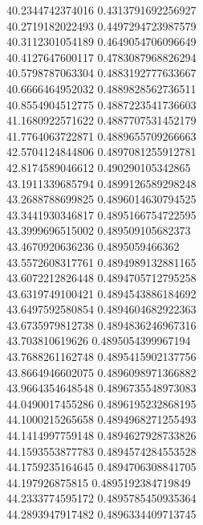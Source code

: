 {40.2344742374016 0.4313791692256927
 \\
40.2719182022493 0.4497294723987579
 \\
40.3112301054189 0.4649054706096649
 \\
40.4127647600117 0.4783087968826294
 \\
40.5798787063304 0.4883192777633667
 \\
40.6666464952032 0.4889828562736511
 \\
40.8554904512775 0.4887223541736603
 \\
41.1680922571622 0.4887707531452179
 \\
41.7764063722871 0.4889655709266663
 \\
42.5704124844806 0.4897081255912781
 \\
42.8174589046612 0.490290105342865
 \\
43.1911339685794 0.4899126589298248
 \\
43.2688788699825 0.4896014630794525
 \\
43.3441930346817 0.4895166754722595
 \\
43.3999696515002 0.489509105682373
 \\
43.4670920636236 0.4895059466362
 \\
43.5572608317761 0.4894989132881165
 \\
43.6072212826448 0.4894705712795258
 \\
43.6319749100421 0.4894543886184692
 \\
43.6497592580854 0.4894604682922363
 \\
43.6735979812738 0.4894836246967316
 \\
43.703810619626 0.4895054399967194
 \\
43.7688261162748 0.4895415902137756
 \\
43.8664946602075 0.4896098971366882
 \\
43.9664354648548 0.4896735548973083
 \\
44.0490017455286 0.4896195232868195
 \\
44.1000215265658 0.4894968271255493
 \\
44.1414997759148 0.4894627928733826
 \\
44.1593553877783 0.4894574284553528
 \\
44.1759235164645 0.4894706308841705
 \\
44.197926875815 0.4895192384719849
 \\
44.2333774595172 0.4895785450935364
 \\
44.2893947917482 0.4896334409713745
 \\
}
